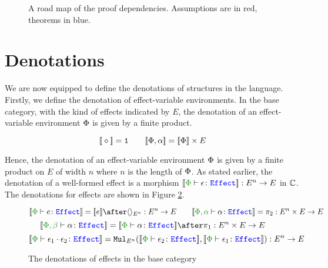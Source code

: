 \documentclass{Report}
\begin{document}
\begin{figure}[H]
\begin{center}
{
    }
    \end{center}
\caption{A road map of the proof dependencies. Assumptions are in red, theorems in blue.}
\label{RoadMap}
\end{figure}


\section{Denotations}\label{PECDenotations}
We are now equipped to define the denotations of structures in the language. Firstly, we define the denotation of effect-variable environments. In the base category, with the kind of effects indicated by $E$, the denotation of an effect-variable environment $\P$ is given by a finite product.

\[
\deno{\nil} = \1 \quad\quad \deno{\P, \a} = \deno{\P}\times E    
\]

Hence, the denotation of an  effect-variable environment $\P$ is given by a finite product on $E$ of width $n$ where $n$ is the length of $\P$. As stated earlier, the denotation of a well-formed effect is a morphism $\deno{\typerelation{\P}{\e}{\effect}}: E^n \rightarrow E$ in $\C$. The denotations for effects are shown in Figure \ref{EffectDenotations}.
\begin{figure}[H]
    \centering
    \begin{framed}
        \[
    \deno{\typerelation{\P}{e}{\effect}} = \deno{e} \after \term{E^n}: E^n\rightarrow E
    \quad\quad
    \deno{\typerelation{\P,\a}{\a}{\effect}} = \pp: E^n\times E \rightarrow E
\]\[
    \deno{\typerelation{\P, \b}{\a}{\effect}} = \deno{\typerelation{\P}{\a}{\effect}}\after\p: E^n\times E\rightarrow E
\]\[
    \deno{\typerelation{\P}{\e_1\dot \e_2}{\effect}} = \Mul_{E^n}(\deno{\typerelation{\P}{\e_2}{\effect}},\deno{\typerelation{\P}{\e_1}{\effect}}): E^n \rightarrow E
\]
    \end{framed}
    \caption{The denotations of effects in the base category}
    \label{EffectDenotations}
\end{figure}
\end{document}
